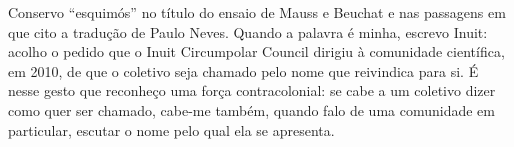 Conservo \enquote{esquimós} no título do ensaio de Mauss e Beuchat e nas passagens em que cito a tradução de Paulo Neves. Quando a palavra é minha, escrevo Inuit: acolho o pedido que o Inuit Circumpolar Council dirigiu à comunidade científica, em 2010, de que o coletivo seja chamado pelo nome que reivindica para si. É nesse gesto que reconheço uma força contracolonial: se cabe a um coletivo dizer como quer ser chamado, cabe-me também, quando falo de uma comunidade em particular, escutar o nome pelo qual ela se apresenta.